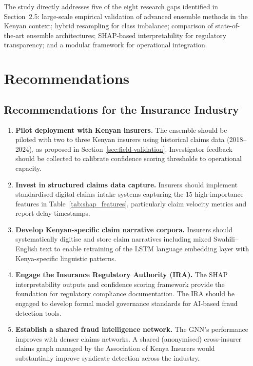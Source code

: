 \documentclass[12pt,a4paper,oneside]{report}
\numberwithin{equation}{chapter}
\begin{document}
The study directly addresses five of the eight research gaps identified in Section~2.5:
large-scale empirical validation of advanced ensemble methods in the Kenyan context; hybrid
resampling for class imbalance; comparison of state-of-the-art ensemble architectures;
SHAP-based interpretability for regulatory transparency; and a modular framework for operational
integration.

\section{Recommendations}

\subsection{Recommendations for the Insurance Industry}

\begin{enumerate}[leftmargin=*, label=\textbf{\arabic*.}]

  \item \textbf{Pilot deployment with Kenyan insurers.}
  The ensemble should be piloted with two to three Kenyan insurers using historical claims data
  (2018--2024), as proposed in Section~\ref{sec:field-validation}. Investigator feedback should
  be collected to calibrate confidence scoring thresholds to operational capacity.

  \item \textbf{Invest in structured claims data capture.}
  Insurers should implement standardised digital claims intake systems capturing the 15
  high-importance features in Table~\ref{tab:shap_features}, particularly claim velocity metrics
  and report-delay timestamps.

  \item \textbf{Develop Kenyan-specific claim narrative corpora.}
  Insurers should systematically digitise and store claim narratives including mixed
  Swahili--English text to enable retraining of the LSTM language embedding layer with
  Kenya-specific linguistic patterns.

  \item \textbf{Engage the Insurance Regulatory Authority (IRA).}
  The SHAP interpretability outputs and confidence scoring framework provide the foundation for
  regulatory compliance documentation. The IRA should be engaged to develop formal model
  governance standards for AI-based fraud detection tools.

  \item \textbf{Establish a shared fraud intelligence network.}
  The GNN's performance improves with denser claims networks. A shared (anonymised) cross-insurer
  claims graph managed by the Association of Kenya Insurers would substantially improve syndicate
  detection across the industry.

\end{enumerate}
\end{document}

